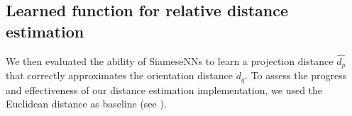 
\subsection{Learned function for relative distance estimation }\label{sec:results:distance-estimation:learned}


We then evaluated the ability of SiameseNNs to learn a projection distance $\widehat{d_p}$ that correctly approximates the orientation distance $d_q$.
To assess the progress and effectiveness of our distance estimation implementation, we used the Euclidean distance as baseline (see ).






